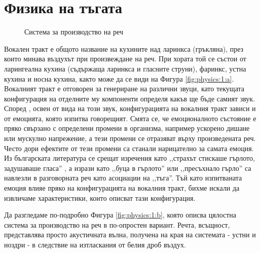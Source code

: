 \documentclass[main.tex]{subfiles}
\begin{document}
\section{Физика на тъгата}
    
    \begin{figure}[ht]%
        \centering
        \begin{changemargin}{0cm}{0cm} 
             \hspace{0.8cm}
        \end{changemargin} 
        \caption{Система за производство на реч}%
        \label{fig:physics:1}
    \end{figure}

    Вокален тракт е общото название на кухините над ларинкса (гръкляна), през които минава въздухът при произвеждане на реч.
    При хората той се състои от ларингеална кухина (съдържаща ларинкса и гласните струни), фаринкс, устна кухина и носна кухина, както може да се види на Фигура \autoref{fig:physics:1:a}. Вокалният тракт е отговорен за генериране на различни звуци, като текущата конфигурация на отделните му компоненти определя какъв ще бъде самият звук.
    Според \cite{emotional:shit}, освен от вида на този звук, конфигурацията на вокалния тракт зависи и от емоцията, която изпитва говорещият. Смята се, че емоционалното състояние е пряко свързано с определени промени в организма, например ускорено дишане или мускулно напрежение, а тези промени се отразяват върху произведената реч. Често дори ефектите от тези промени са станали нарицателно за самата емоция. Из българската литература се срещат изречения като ,,страхът стискаше гърлото, задушаваше гласа'' \cite{talev}, а изрази като ,,буца в гърлото'' или ,,пресъхнало гърло'' са навлезли в разговорната реч като асоциации на ,,тъга''. Тъй като изпитваната емоция влияе пряко на конфигурацията на вокалния тракт, бихме искали да извличаме характеристики, които описват тази конфигурация.
    
    Да разгледаме по-подробно Фигура \autoref{fig:physics:1:b}, която описва цялостна система за производство на реч в по-опростен вариант.
    Речта, всъщност, представлява просто акустичната вълна, получена на края на системата - устни и ноздри - в следствие на изтласкания от белия дроб въздух.
\end{document}

